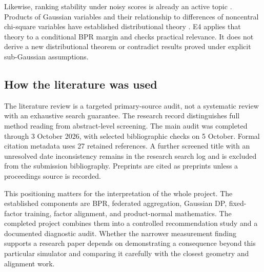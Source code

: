 Likewise, ranking stability under noisy scores is already an active topic
\citep{urmian2026slate}. Products of Gaussian variables and their relationship
to differences of noncentral chi-square variables have established
distributional theory \citep{gaunt2024product}. E4 applies that theory to a
conditional BPR margin and checks practical relevance. It does not derive a
new distributional theorem or contradict results proved under explicit
sub-Gaussian assumptions.

\subsection{How the literature was used}
The literature review is a targeted primary-source audit, not a systematic
review with an exhaustive search guarantee. The research record distinguishes
full method reading from abstract-level screening. The main audit was completed
through 3 October 2026, with selected bibliographic checks on 5 October. Formal
citation metadata uses 27 retained references. A further screened title with
an unresolved date inconsistency remains in the research search log and is
excluded from the submission bibliography. Preprints are cited as preprints
unless a proceedings source is recorded.

This positioning matters for the interpretation of the whole project. The
established components are BPR, federated aggregation, Gaussian DP, fixed-factor
training, factor alignment, and product-normal mathematics. The completed
project combines them into a controlled recommendation study and a documented
diagnostic audit. Whether the narrower measurement finding supports a research
paper depends on demonstrating a consequence beyond this particular simulator
and comparing it carefully with the closest geometry and alignment work.
